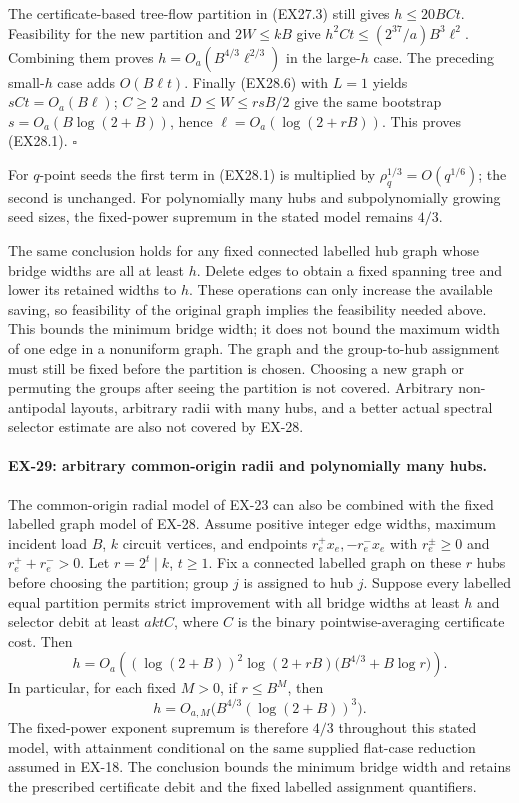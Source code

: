 The certificate-based tree-flow partition in (EX27.3)
still gives $h\le20BCt$. Feasibility for the new partition
and $2W\le kB$ give
$h^2Ct\le(2^{37}/a)B^3\ell^2$.
Combining them proves
$h=O_a(B^{4/3}\ell^{2/3})$ in the large-$h$ case.
The preceding small-$h$ case adds $O(B\ell t)$.
Finally (EX28.6) with $L=1$ yields
$sCt=O_a(B\ell)$; $C\ge2$ and
$D\le W\le rsB/2$ give the same bootstrap
$s=O_a(B\log(2+B))$, hence
$\ell=O_a(\log(2+rB))$. This proves (EX28.1).
\hfill$\square$

For $q$-point seeds the first term in (EX28.1) is multiplied
by $\rho_q^{1/3}=O(q^{1/6})$; the second is unchanged.
For polynomially many hubs and subpolynomially growing seed
sizes, the fixed-power supremum in the stated model remains
$4/3$.

The same conclusion holds for any fixed connected labelled hub
graph whose bridge widths are all at least $h$. Delete edges to
obtain a fixed spanning tree and lower its retained widths to
$h$. These operations can only increase the available saving,
so feasibility of the original graph implies the feasibility
needed above. This bounds the minimum bridge width; it does
not bound the maximum width of one edge in a nonuniform graph.
The graph and the group-to-hub assignment must still be fixed
before the partition is chosen. Choosing a new graph or
permuting the groups after seeing the partition is not covered.
Arbitrary non-antipodal layouts, arbitrary radii with many hubs,
and a better actual spectral selector estimate are also not
covered by EX-28.

\paragraph{EX-29: arbitrary common-origin radii and polynomially many hubs.}
The common-origin radial model of EX-23 can also be combined with
the fixed labelled graph model of EX-28. Assume positive integer
edge widths, maximum incident load $B$, $k$ circuit vertices,
and endpoints $r_e^+x_e,-r_e^-x_e$ with $r_e^\pm\ge0$ and
$r_e^++r_e^->0$. Let $r=2^t\mid k$, $t\ge1$.
Fix a connected labelled graph on these $r$ hubs before choosing
the partition; group $j$ is assigned to hub $j$. Suppose every
labelled equal partition permits strict improvement with all
bridge widths at least $h$ and selector debit at least $aktC$,
where $C$ is the binary pointwise-averaging certificate cost.
Then
\[
 h=O_a\!\left((\log(2+B))^2\log(2+rB)
                   \bigl(B^{4/3}+B\log r\bigr)\right).
 \tag{EX29.1}
\]
In particular, for each fixed $M>0$, if $r\le B^M$, then
\[
 h=O_{a,M}\bigl(B^{4/3}(\log(2+B))^3\bigr).
 \tag{EX29.2}
\]
The fixed-power exponent supremum is therefore $4/3$ throughout
this stated model, with attainment conditional on the same
supplied flat-case reduction assumed in EX-18. The conclusion bounds the minimum bridge
width and retains the prescribed certificate debit and the
fixed labelled assignment quantifiers.

